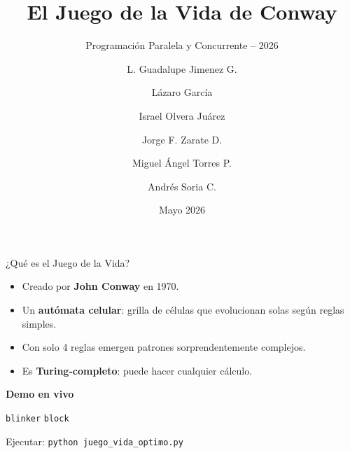 \documentclass[10pt,aspectratio=169]{beamer}
\title[El Juego de la Vida]{El Juego de la Vida de Conway}
\subtitle{Programación Paralela y Concurrente -- 2026}
\author[Equipo Rosa]{
  L. Guadalupe Jimenez G. \and
  Lázaro García \and
  Israel Olvera Juárez \and
  Jorge F. Zarate D. \and
  Miguel Ángel Torres P. \and
  Andrés Soria C.
}
\institute[UNAM]{Universidad Nacional Autónoma de México}
\date{Mayo 2026}
\newcommand{\demo}[1]{\textcolor{democolor}{\texttt{#1}}}
\begin{document}
\begin{frame}
  \titlepage
\end{frame}

\begin{frame}{¿Qué es el Juego de la Vida?}

  \vspace{0.4cm}

  \begin{itemize}
    \item Creado por \textbf{John Conway} en 1970.
    \item Un \textbf{autómata celular}: grilla de células que evolucionan
          solas según reglas simples.
    \item Con solo 4 reglas emergen patrones sorprendentemente complejos.
    \item Es \textbf{Turing-completo}: puede hacer cualquier cálculo.
  \end{itemize}

  \vspace{0.5cm}

  \begin{center}
    \textbf{Demo en vivo}

    \demo{blinker} \quad \demo{block}

    \small Ejecutar: \texttt{python juego\_vida\_optimo.py}
  \end{center}
\end{frame}
\end{document}
